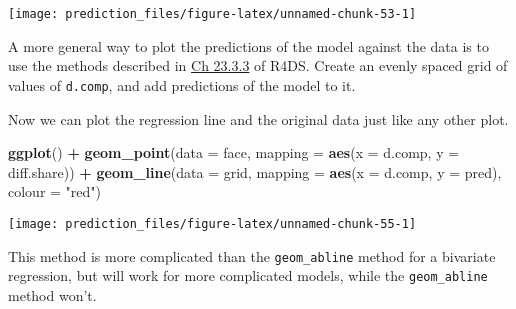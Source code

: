 \documentclass[]{book}
\newenvironment{Shaded}{\begin{snugshade}}{\end{snugshade}}
\newcommand{\CommentTok}[1]{\textcolor[rgb]{0.56,0.35,0.01}{\textit{#1}}}
\newcommand{\DataTypeTok}[1]{\textcolor[rgb]{0.13,0.29,0.53}{#1}}
\newcommand{\KeywordTok}[1]{\textcolor[rgb]{0.13,0.29,0.53}{\textbf{#1}}}
\newcommand{\NormalTok}[1]{#1}
\newcommand{\OperatorTok}[1]{\textcolor[rgb]{0.81,0.36,0.00}{\textbf{#1}}}
\newcommand{\StringTok}[1]{\textcolor[rgb]{0.31,0.60,0.02}{#1}}
\theoremstyle{definition}
\theoremstyle{definition}
\theoremstyle{definition}
\theoremstyle{remark}
\begin{document}
\begin{center}\texttt{[image: prediction\_files/figure-latex/unnamed-chunk-53-1]} \end{center}

A more general way to plot the predictions of the model against the data
is to use the methods described in
\href{http://r4ds.had.co.nz/model-basics.html\#visualising-models}{Ch
23.3.3} of R4DS. Create an evenly spaced grid of values of
\texttt{d.comp}, and add predictions of the model to it.

\begin{Shaded}
\end{Shaded}

Now we can plot the regression line and the original data just like any
other plot.

\begin{Shaded}
\begin{Highlighting}[]
\KeywordTok{ggplot}\NormalTok{() }\OperatorTok{+}
\StringTok{  }\KeywordTok{geom_point}\NormalTok{(}\DataTypeTok{data =}\NormalTok{ face, }\DataTypeTok{mapping =} \KeywordTok{aes}\NormalTok{(}\DataTypeTok{x =}\NormalTok{ d.comp, }\DataTypeTok{y =}\NormalTok{ diff.share)) }\OperatorTok{+}
\StringTok{  }\KeywordTok{geom_line}\NormalTok{(}\DataTypeTok{data =}\NormalTok{ grid, }\DataTypeTok{mapping =} \KeywordTok{aes}\NormalTok{(}\DataTypeTok{x =}\NormalTok{ d.comp, }\DataTypeTok{y =}\NormalTok{ pred),}
            \DataTypeTok{colour =} \StringTok{"red"}\NormalTok{)}
\end{Highlighting}
\end{Shaded}

\begin{center}\texttt{[image: prediction\_files/figure-latex/unnamed-chunk-55-1]} \end{center}

This method is more complicated than the \texttt{geom\_abline} method
for a bivariate regression, but will work for more complicated models,
while the \texttt{geom\_abline} method won't.
\end{document}

